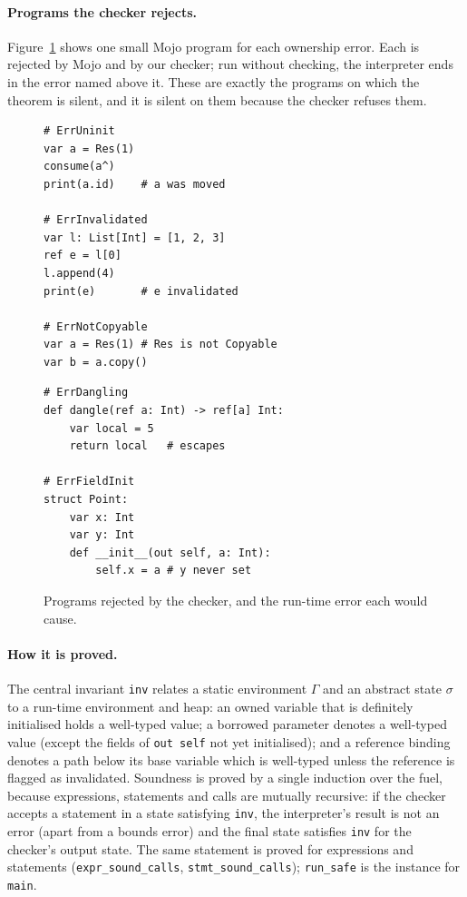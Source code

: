 \documentclass[11pt,a4paper]{article}
\newcommand{\code}[1]{\texttt{#1}}
\begin{document}
\paragraph{Programs the checker rejects.}
Figure~\ref{fig:rejected} shows one small Mojo program for each ownership error.
Each is rejected by Mojo and by our checker; run without checking, the
interpreter ends in the error named above it. These are exactly the programs on
which the theorem is silent, and it is silent on them because the checker refuses
them.
\begin{figure}[t]
\centering
\begin{minipage}[t]{0.49\textwidth}
\begin{lstlisting}[basicstyle=\ttfamily\footnotesize]
# ErrUninit
var a = Res(1)
consume(a^)
print(a.id)    # a was moved

# ErrInvalidated
var l: List[Int] = [1, 2, 3]
ref e = l[0]
l.append(4)
print(e)       # e invalidated

# ErrNotCopyable
var a = Res(1) # Res is not Copyable
var b = a.copy()
\end{lstlisting}
\end{minipage}%
\begin{minipage}[t]{0.49\textwidth}
\begin{lstlisting}[basicstyle=\ttfamily\footnotesize]
# ErrDangling
def dangle(ref a: Int) -> ref[a] Int:
    var local = 5
    return local   # escapes

# ErrFieldInit
struct Point:
    var x: Int
    var y: Int
    def __init__(out self, a: Int):
        self.x = a # y never set
\end{lstlisting}
\end{minipage}
\caption{Programs rejected by the checker, and the run-time error each would cause.}
\label{fig:rejected}
\end{figure}

\paragraph{How it is proved.}
The central invariant \code{inv} relates a static environment $\Gamma$ and an
abstract state $\sigma$ to a run-time environment and heap: an owned variable that
is definitely initialised holds a well-typed value; a borrowed parameter denotes a
well-typed value (except the fields of \code{out self} not yet initialised); and a
reference binding denotes a path below its base variable which is well-typed
unless the reference is flagged as invalidated. Soundness is proved by a single
induction over the fuel, because expressions, statements and calls are mutually
recursive: if the checker accepts a statement in a state satisfying \code{inv}, the
interpreter's result is not an error (apart from a bounds error) and the final
state satisfies \code{inv} for the checker's output state. The same statement is
proved for expressions and statements (\code{expr\_sound\_calls},
\code{stmt\_sound\_calls}); \code{run\_safe} is the instance for \code{main}.
\end{document}
